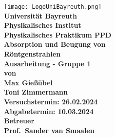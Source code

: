 \documentclass{article}               %
\begin{document}
  \setlength{\parindent}{0em}
    \begin{titlepage}
        \centering
        \texttt{[image: LogoUniBayreuth.png]}
        \vspace{0.5cm}
        {\large \textbf{\\Universität Bayreuth\\Physikalisches Institut\\Physikalisches Praktikum PPD}\\}
        \vspace{2.5cm}
        {\Huge \textbf{Absorption und Beugung von\\Röntgenstrahlen}\\}
        \vspace{2.5cm}
        {\LARGE \textbf{Ausarbeitung - Gruppe 1}\\}
        \vspace{0.5cm}
        {\large \textbf{von}\\}
        {\LARGE \textbf{Max Gießübel}\\}
        {\LARGE \textbf{Toni Zimmermann}\\} 	
        \vspace{2cm}
        {\large \textbf{Versuchstermin: 26.02.2024}\\}
        {\large \textbf{Abgabetermin: 10.03.2024}\\}
        \vspace{2cm}
        {\large \textbf{Betreuer\\}}
        {\LARGE \textbf{Prof.~Sander van Smaalen\\}}
        \vfill
    \end{titlepage}
    
    \tableofcontents
    \newpage
    
    
    \newpage
    
    \newpage
    
    \newpage
    
    \newpage
    
    \newpage
    
    \printbibliography
    \appendix
    
\end{document}

